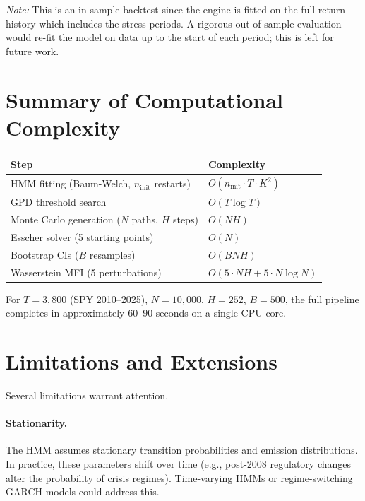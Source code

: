 \documentclass[12pt]{article}
\begin{document}
\noindent\textit{Note:} This is an in-sample backtest since the engine
is fitted on the full return history which includes the stress periods.
A rigorous out-of-sample evaluation would re-fit the model on data up
to the start of each period; this is left for future work.

\section{Summary of Computational Complexity}

\begin{center}
\begin{tabular}{ll}
\toprule
Step & Complexity \\
\midrule
HMM fitting (Baum-Welch, $n_{\text{init}}$ restarts) & $O(n_{\text{init}}\cdot T \cdot K^2)$ \\
GPD threshold search & $O(T \log T)$ \\
Monte Carlo generation ($N$ paths, $H$ steps) & $O(NH)$ \\
Esscher solver (5 starting points) & $O(N)$ \\
Bootstrap CIs ($B$ resamples) & $O(BNH)$ \\
Wasserstein MFI (5 perturbations) & $O(5 \cdot NH + 5 \cdot N \log N)$ \\
\bottomrule
\end{tabular}
\end{center}

For $T=3{,}800$ (SPY 2010--2025), $N=10{,}000$, $H=252$, $B=500$,
the full pipeline completes in approximately 60--90 seconds on a
single CPU core.

\section{Limitations and Extensions}

Several limitations warrant attention.

\paragraph{Stationarity.}  The HMM assumes stationary transition
probabilities and emission distributions.  In practice, these
parameters shift over time (e.g., post-2008 regulatory changes alter
the probability of crisis regimes).  Time-varying HMMs or
regime-switching GARCH models could address this.
\end{document}
